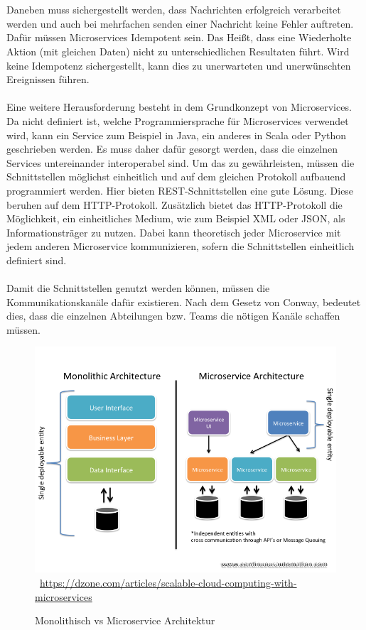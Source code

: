 \\\\
Daneben muss sichergestellt werden, dass Nachrichten erfolgreich verarbeitet werden und auch bei mehrfachen senden einer Nachricht keine Fehler auftreten. Dafür müssen Microservices Idempotent sein. Das Heißt, dass eine Wiederholte Aktion (mit gleichen Daten) nicht zu unterschiedlichen Resultaten führt. Wird keine Idempotenz sichergestellt, kann dies zu unerwarteten und unerwünschten Ereignissen führen.
\\\\
Eine weitere Herausforderung besteht in dem Grundkonzept von Microservices. Da nicht definiert ist, welche Programmiersprache für Microservices verwendet wird, kann ein Service zum Beispiel in Java, ein anderes in Scala oder Python geschrieben werden. Es muss daher dafür gesorgt werden, dass die einzelnen Services untereinander interoperabel sind. Um das zu gewährleisten, müssen die Schnittstellen möglichst einheitlich und auf dem gleichen Protokoll aufbauend programmiert werden. Hier bieten REST-Schnittstellen eine gute Lösung. Diese beruhen auf dem HTTP-Protokoll. Zusätzlich bietet das HTTP-Protokoll die Möglichkeit, ein einheitliches Medium, wie zum Beispiel XML oder JSON, als Informationsträger zu nutzen. Dabei kann theoretisch jeder Microservice mit jedem anderen Microservice kommunizieren, sofern die Schnittstellen einheitlich definiert sind.
\\\\
Damit die Schnittstellen genutzt werden können, müssen die Kommunikationskanäle dafür existieren. Nach dem Gesetz von Conway, bedeutet dies, dass die einzelnen Abteilungen bzw. Teams die nötigen Kanäle schaffen müssen.
\newpage
\begin{figure}[htb]
	\centering 
	\includegraphics[width=\linewidth]{content/images/570495-slide1}\
	\quelle\url{https://dzone.com/articles/scalable-cloud-computing-with-microservices}
	\caption{Monolithisch vs Microservice Architektur\\}
	\label{fig:MonoVSMicroArchitektur} 
\end{figure}
